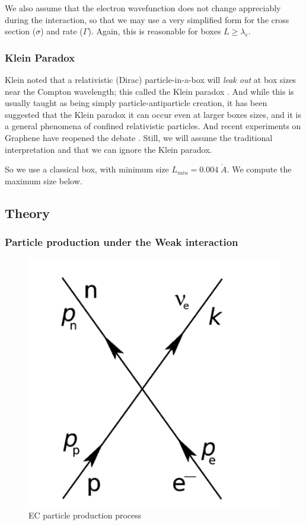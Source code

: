 \documentclass[%
 aip,
 jmp,%
 amsmath,amssymb,
 reprint,%
]{revtex4-1}
\begin{document}
We also assume that the electron wavefunction does not change appreciably during the interaction, so that we may use a very simplified form for the cross section ($\sigma$) and rate ($\Gamma$).  Again, this is reasonable for boxes $L\ge\lambda_{e}$.

\subsubsection{Klein Paradox}

Klein noted that a relativistic (Dirac) particle-in-a-box will \emph{leak out} at box sizes near the Compton wavelength; this called the Klein paradox \cite{klein1,klein2}.  And while this is usually taught as being simply particle-antiparticle creation, it has been suggested that the Klein paradox it can occur even at larger boxes sizes, and it is a general phenomena of confined relativistic particles.  And recent experiments on Graphene have reopened the debate \cite{klein3}. Still, we will assume the traditional interpretation and that we can ignore the Klein paradox.

So we use a classical box, with minimum size $L_{min}=0.004\;\mathring{A}$.  We compute the maximum size below.


\subsection{Theory}

\subsubsection{Particle production under the Weak interaction}

\begin{figure}
   \includegraphics[scale=0.25]{img/feynman.png}
   \caption{EC particle production process}
  \label{fig:ppp}
\end{figure}
\end{document}
